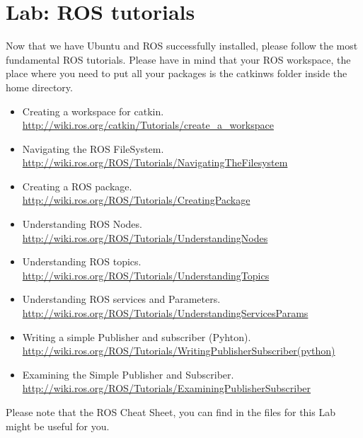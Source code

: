\documentclass[a4paper,10pt]{article}
\begin{document}
\section{Lab: ROS tutorials}
Now that we have Ubuntu and ROS successfully installed, please follow the most fundamental ROS tutorials. Please have in mind that your ROS workspace, the place where you need to put all your packages is the catkin{\textunderscore}ws folder inside the home directory.

\begin{itemize}
    \item Creating a workspace for catkin.\\
    \url{http://wiki.ros.org/catkin/Tutorials/create_a_workspace}
    
    \item Navigating the ROS FileSystem.\\
    \url{http://wiki.ros.org/ROS/Tutorials/NavigatingTheFilesystem}
    
    \item Creating a ROS package.\\
    \url{http://wiki.ros.org/ROS/Tutorials/CreatingPackage}
    
    \item Understanding ROS Nodes.\\
    \url{http://wiki.ros.org/ROS/Tutorials/UnderstandingNodes}
    
    \item Understanding ROS topics.\\
    \url{http://wiki.ros.org/ROS/Tutorials/UnderstandingTopics}
    
    \item Understanding ROS services and Parameters.\\
    \url{http://wiki.ros.org/ROS/Tutorials/UnderstandingServicesParams}
    
    \item Writing a simple Publisher and subscriber (Pyhton).\\
    \url{http://wiki.ros.org/ROS/Tutorials/WritingPublisherSubscriber(python)}
    
    \item Examining the Simple Publisher and Subscriber.\\
    \url{http://wiki.ros.org/ROS/Tutorials/ExaminingPublisherSubscriber}
\end{itemize}
\noindent
Please note that the ROS Cheat Sheet, you can find in the files for this Lab might be useful for you.
\end{document}
